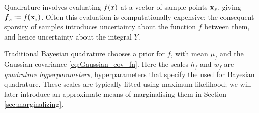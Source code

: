 \documentclass{article}
\begin{document}
Quadrature involves evaluating $f(\lfv)$ at a vector of sample points $\vlfv_s$, giving $\vf\pha_s\deq f(\vlfv_s)$. Often this evaluation is computationally expensive; the consequent sparsity of samples introduces uncertainty about the function $f$ between them, and hence uncertainty about the integral $Y$.



Traditional Bayesian quadrature chooses a \gpb prior for $f$, with mean $\mu_f$ and the Gaussian covariance \eqref{eq:Gaussian_cov_fn}. Here the scales $h_f$ and $w_f$ are \emph{quadrature hyperparameters}, hyperparameters that specify the  \gpb used for Bayesian quadrature. These scales are typically fitted using maximum likelihood; we will later introduce an approximate means of marginalising them in Section \ref{sec:marginalizing}.

\end{document}
